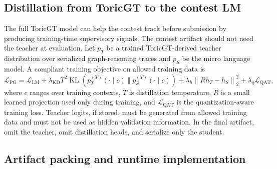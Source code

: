 \documentclass[11pt]{article}
\theoremstyle{definition}
\theoremstyle{plain}
\theoremstyle{remark}
\numberwithin{equation}{section}
\newcommand{\norm}[1]{\left\lVert #1\right\rVert}
\begin{document}
\subsection{Distillation from ToricGT to the contest LM}

The full ToricGT model can help the contest track before submission by producing training-time supervisory signals.  The contest artifact should not need the teacher at evaluation.  Let $p_T$ be a trained ToricGT-derived teacher distribution over serialized graph-reasoning traces and $p_S$ be the micro language model.  A compliant training objective on allowed training data is
\begin{equation}
  \mathcal L_{\mathrm{PG}}=\mathcal L_{\mathrm{LM}}
  +\lambda_{\mathrm{KD}}T^2\operatorname{KL}\left(p_T^{(T)}(\cdot\mid c)\;\Vert\;p_S^{(T)}(\cdot\mid c)\right)
  +\lambda_h\norm{R h_T-h_S}_2^2
  +\lambda_q\mathcal L_{\mathrm{QAT}},
\end{equation}
where $c$ ranges over training contexts, $T$ is distillation temperature, $R$ is a small learned projection used only during training, and $\mathcal L_{\mathrm{QAT}}$ is the quantization-aware training loss.  Teacher logits, if stored, must be generated from allowed training data and must not be used as hidden validation information.  In the final artifact, omit the teacher, omit distillation heads, and serialize only the student.


\subsection{Artifact packing and runtime implementation}
\end{document}
